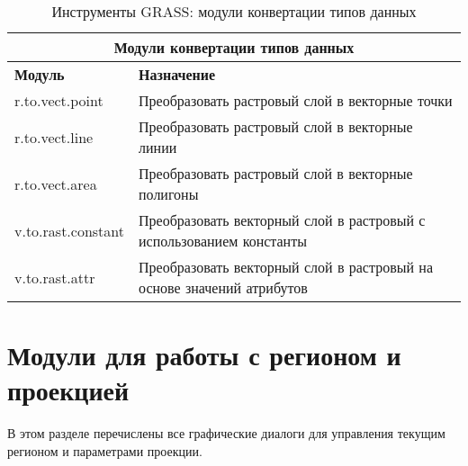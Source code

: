 {\renewcommand{\arraystretch}{0.7}
\begin{table}[H]
\centering
 \begin{tabular}{|p{4cm}|p{11cm}|}
  \hline \multicolumn{2}{|c|}{\textbf{Модули конвертации типов данных}} \\
  \hline \textbf{Модуль} & \textbf{Назначение} \\
  \hline r.to.vect.point & Преобразовать растровый слой в векторные точки \\
  \hline r.to.vect.line & Преобразовать растровый слой в векторные линии \\
  \hline r.to.vect.area & Преобразовать растровый слой в векторные полигоны \\
  \hline v.to.rast.constant & Преобразовать векторный слой в растровый
  с использованием константы \\
  \hline v.to.rast.attr & Преобразовать векторный слой в растровый на
  основе значений атрибутов \\
\hline
\end{tabular}
 \caption{Инструменты GRASS: модули конвертации типов данных}
\end{table}}


\section{Модули для работы с регионом и проекцией}

В этом разделе перечислены все графические диалоги для управления
текущим регионом и параметрами проекции.

